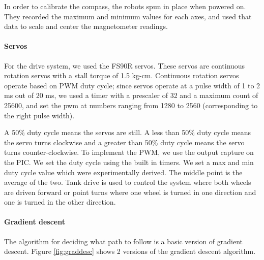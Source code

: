 \documentclass[]{article}
\let\oldparagraph\paragraph
\renewcommand{\paragraph}[1]{\oldparagraph{#1}\mbox{}}
\begin{document}
In order to calibrate the compass, the robots spun in place when powered
on. They recorded the maximum and minimum values for each axes, and used
that data to scale and center the magnetometer readings.

\paragraph{Servos}

For the drive system, we used the FS90R servos. These servos are
continuous rotation servos with a stall torque of 1.5 kg-cm. Continuous
rotation servos operate based on PWM duty cycle; since servos operate at
a pulse width of 1 to 2 ms out of 20 ms, we used a timer with a
prescaler of 32 and a maximum count of 25600, and set the pwm at numbers
ranging from 1280 to 2560 (corresponding to the right pulse width).

A 50\% duty cycle means the servos are still. A less than 50\% duty
cycle means the servo turns clockwise and a greater than 50\% duty cycle
means the servo turns counter-clockwise. To implement the PWM, we use
the output capture on the PIC. We set the duty cycle using the built in
timers. We set a max and min duty cycle value which were experimentally
derived. The middle point is the average of the two. Tank drive is used
to control the system where both wheels are driven forward or point
turns where one wheel is turned in one direction and one is turned in
the other direction.

\paragraph{Gradient descent}

The algorithm for deciding what path to follow is a basic version of
gradient descent. Figure \ref{fig:graddesc} shows 2 versions of the gradient descent algorithm.
\end{document}
